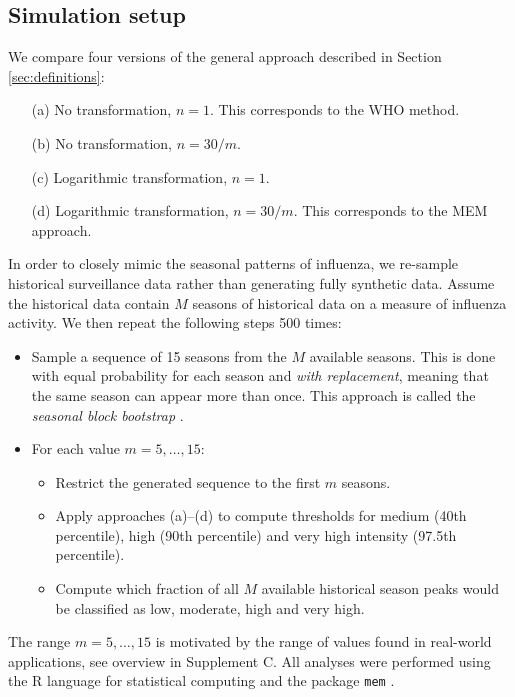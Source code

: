 \documentclass{article}
\begin{document}
\subsection{Simulation setup}
\label{subsec:simulation_setup}

We compare four versions of the general approach described in Section \ref{sec:definitions}:
\begin{enumerate}
\item[(a)] No transformation, $n = 1$. This corresponds to the WHO method.
\item[(b)] No transformation, $n = 30/m$.
\item[(c)] Logarithmic transformation, $n = 1$.
\item[(d)] Logarithmic transformation, $n = 30/m$. This corresponds to the MEM approach.
\end{enumerate}
In order to closely mimic the seasonal patterns of influenza, we re-sample historical surveillance data rather than generating fully synthetic data. Assume the historical data contain $M$ seasons of historical data on a measure of influenza activity. We then repeat the following steps 500 times:

\begin{itemize}
\item Sample a sequence of 15 seasons from the $M$ available seasons. This is done with equal probability for each season and \textit{with replacement}, meaning that the same season can appear more than once. This approach is called the \textit{seasonal block bootstrap} \citep{Politis2001}.
\item For each value $m = 5, \dots, 15$:
\begin{itemize}
\item Restrict the generated sequence to the first $m$ seasons.
\item Apply approaches (a)--(d) to compute thresholds for medium (40th percentile), high (90th percentile) and very high intensity (97.5th percentile).
\item Compute which fraction of all $M$ available historical season peaks would be classified as low, moderate, high and very high.
\end{itemize}
\end{itemize}
The range $m =5, \dots, 15$ is motivated by the range of values found in real-world applications, see overview in Supplement C. All analyses were performed using the R language for statistical computing \citep{RCT2020} and the package \texttt{mem} \citep{Lozano2020}.
\end{document}
